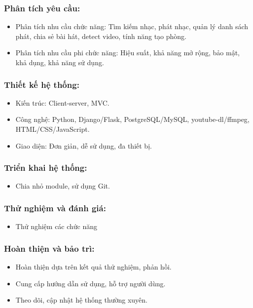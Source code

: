 \documentclass[a4paper]{article}
\begin{document}
\subsubsection{Phân tích yêu cầu:}
\begin{itemize}
	\item Phân tích nhu cầu chức năng: Tìm kiếm nhạc, phát nhạc, quản lý danh sách phát, chia sẻ bài hát, detect video, tính năng tạo phòng.
    \item Phân tích nhu cầu phi chức năng: Hiệu suất, khả năng mở rộng, bảo mật, khả dụng, khả năng sử dụng.
\end{itemize}

\subsubsection{Thiết kế hệ thống:}
\begin{itemize}
	\item Kiến trúc: Client-server, MVC.
    \item Công nghệ: Python, Django/Flask, PostgreSQL/MySQL, youtube-dl/ffmpeg, HTML/CSS/JavaScript.
    \item Giao diện: Đơn giản, dễ sử dụng, đa thiết bị.
\end{itemize}

\subsubsection{Triển khai hệ thống:}
\begin{itemize}
	\item Chia nhỏ module, sử dụng Git.
\end{itemize}

\subsubsection{Thử nghiệm và đánh giá:}
\begin{itemize}
	\item Thử nghiệm các chức năng
\end{itemize}

\subsubsection{Hoàn thiện và bảo trì:}
\begin{itemize}
	\item Hoàn thiện dựa trên kết quả thử nghiệm, phản hồi.
    \item Cung cấp hướng dẫn sử dụng, hỗ trợ người dùng.
    \item Theo dõi, cập nhật hệ thống thường xuyên.
\end{itemize}
\end{document}
